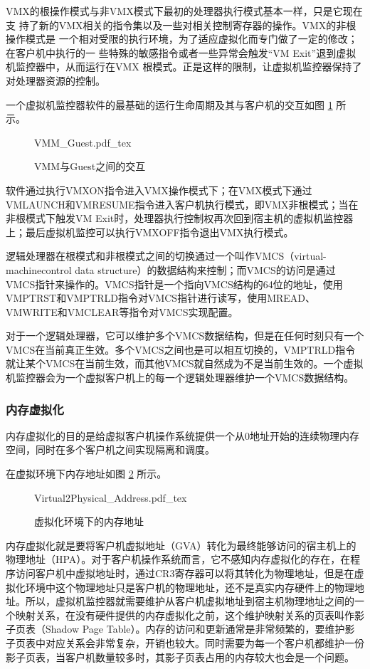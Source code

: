 VMX的根操作模式与非VMX模式下最初的处理器执行模式基本一样，只是它现在支
持了新的VMX相关的指令集以及一些对相关控制寄存器的操作。VMX的非根操作模式是
一个相对受限的执行环境，为了适应虚拟化而专门做了一定的修改；在客户机中执行的一
些特殊的敏感指令或者一些异常会触发“VM Exit”退到虚拟机监控器中，从而运行在VMX
根模式。正是这样的限制，让虚拟机监控器保持了对处理器资源的控制。

一个虚拟机监控器软件的最基础的运行生命周期及其与客户机的交互如图 \ref{fig:VMM_Guest} 所示。
\begin{figure}[htbp]
    \centering
    \def\svgwidth{\columnwidth}
    {VMM_Guest.pdf_tex}
    \caption{VMM与Guest之间的交互}
    \label{fig:VMM_Guest}
\end{figure}
软件通过执行VMXON指令进入VMX操作模式下；在VMX模式下通过VMLAUNCH和VMRESUME指令进入客户机执行模式，即VMX非根模式；当在非根模式下触发VM Exit时，处理器执行控制权再次回到宿主机的虚拟机监控器上；最后虚拟机监控可以执行VMXOFF指令退出VMX执行模式。

逻辑处理器在根模式和非根模式之间的切换通过一个叫作VMCS（virtual-machinecontrol data structure）的数据结构来控制；而VMCS的访问是通过VMCS指针来操作的。VMCS指针是一个指向VMCS结构的64位的地址，使用VMPTRST和VMPTRLD指令对VMCS指针进行读写，使用MREAD、VMWRITE和VMCLEAR等指令对VMCS实现配置。

对于一个逻辑处理器，它可以维护多个VMCS数据结构，但是在任何时刻只有一个VMCS在当前真正生效。多个VMCS之间也是可以相互切换的，VMPTRLD指令就让某个VMCS在当前生效，而其他VMCS就自然成为不是当前生效的。一个虚拟机监控器会为一个虚拟客户机上的每一个逻辑处理器维护一个VMCS数据结构。

\subsubsection{内存虚拟化}
内存虚拟化的目的是给虚拟客户机操作系统提供一个从0地址开始的连续物理内存空间，同时在多个客户机之间实现隔离和调度。

在虚拟环境下内存地址如图 \ref{fig:Virtual2Physical_Address} 所示。
\begin{figure}[htbp]
    \centering
    \def\svgscale{0.5}
    {Virtual2Physical_Address.pdf_tex}
    \caption{虚拟化环境下的内存地址}
    \label{fig:Virtual2Physical_Address}
\end{figure}

内存虚拟化就是要将客户机虚拟地址（GVA）转化为最终能够访问的宿主机上的物理地址（HPA）。对于客户机操作系统而言，它不感知内存虚拟化的存在，在程序访问客户机中虚拟地址时，通过CR3寄存器可以将其转化为物理地址，但是在虚拟化环境中这个物理地址只是客户机的物理地址，还不是真实内存硬件上的物理地址。所以，虚拟机监控器就需要维护从客户机虚拟地址到宿主机物理地址之间的一个映射关系，在没有硬件提供的内存虚拟化之前，这个维护映射关系的页表叫作影子页表（Shadow Page Table）。内存的访问和更新通常是非常频繁的，要维护影子页表中对应关系会非常复杂，开销也较大。同时需要为每一个客户机都维护一份影子页表，当客户机数量较多时，其影子页表占用的内存较大也会是一个问题。

